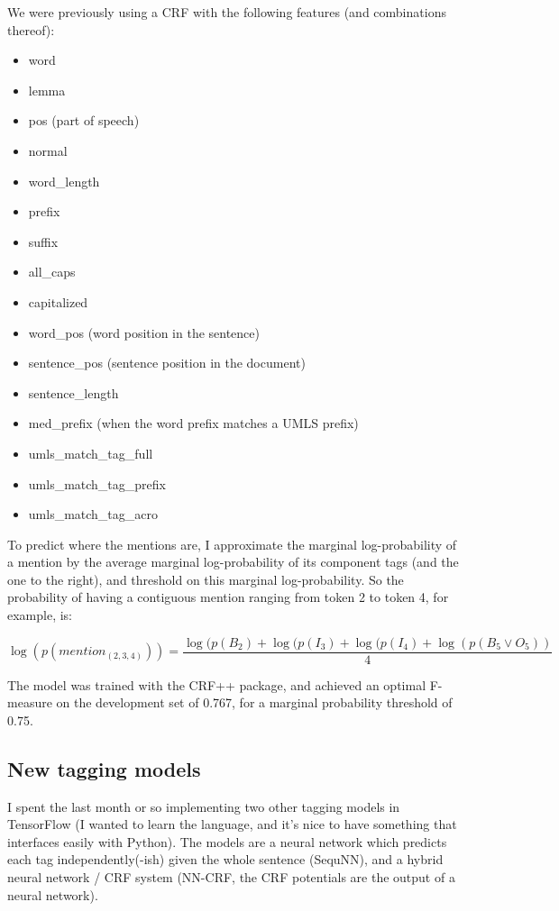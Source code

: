 \documentclass[10pt,a4paper]{article}
\begin{document}
 We were previously using a CRF with the following features (and combinations thereof):
 \begin{itemize}
 \item word
 \item lemma
 \item pos (part of speech)
 \item normal
 \item word\_length
 \item prefix
 \item suffix
 \item all\_caps
 \item capitalized
 \item word\_pos (word position in the sentence)
 \item sentence\_pos (sentence position in the document)
 \item sentence\_length
 \item med\_prefix (when the word prefix matches a UMLS prefix)
 \item umls\_match\_tag\_full
 \item umls\_match\_tag\_prefix
 \item umls\_match\_tag\_acro
 \end{itemize}

 To predict where the mentions are, I approximate the marginal log-probability of a mention by the average marginal log-probability of its component tags (and the one to the right), and threshold on this marginal log-probability. So the probability of having a contiguous mention ranging from token 2 to token 4, for example, is:
 
 $$\log(p(mention_{(2, 3, 4)})) = \frac{\log(p(B_2) + \log(p(I_3) + \log(p(I_4) + \log(p(B_5 \vee O_5))}{4}$$

 The model was trained with the CRF++ package, and achieved an optimal F-measure on the development set of 0.767, for a marginal probability threshold of 0.75.

\subsection{New tagging models}

  I spent the last month or so implementing two other tagging models in TensorFlow (I wanted to learn the language, and it's nice to have something that interfaces easily with Python). The models are a neural network which predicts each tag independently(-ish) given the whole sentence (SequNN), and a hybrid neural network / CRF system (NN-CRF, the CRF potentials are the output of a neural network).
\end{document}
